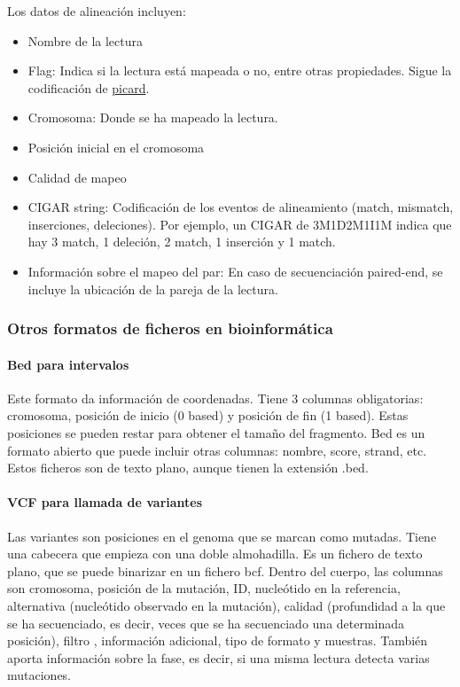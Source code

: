 Los datos de alineación incluyen: 
\begin{itemize} 
\item Nombre de la lectura 
\item Flag: Indica si la lectura está mapeada o no, entre otras propiedades. Sigue la codificación de \href{https://broadinstitute.github.io/picard/explain-flags.html}{picard}.
\item Cromosoma: Donde se ha mapeado la lectura. 
\item Posición inicial en el cromosoma 
\item Calidad de mapeo 
\item CIGAR string: Codificación de los eventos de alineamiento (match, mismatch, inserciones, deleciones). Por ejemplo, un CIGAR de 3M1D2M1I1M indica que hay 3 match, 1 deleción, 2 match, 1 inserción y 1 match.
\item Información sobre el mapeo del par: En caso de secuenciación paired-end, se incluye la ubicación de la pareja de la lectura. 
\end{itemize}

\subsubsection{Otros formatos de ficheros en bioinformática}
\paragraph{Bed para intervalos}
Este formato da información de coordenadas. Tiene 3 columnas obligatorias: cromosoma, posición de inicio (0 based) y posición de fin (1 based). Estas posiciones se pueden restar para obtener el tamaño del fragmento. Bed es un formato abierto que puede incluir otras columnas: nombre, score, strand, etc. Estos ficheros son de texto plano, aunque tienen la extensión .bed. 

\paragraph{VCF para llamada de variantes}
Las variantes son posiciones en el genoma que se marcan como mutadas. Tiene una cabecera que empieza con una doble almohadilla. Es un fichero de texto plano, que se puede binarizar en un fichero bcf. Dentro del cuerpo, las columnas son cromosoma, posición de la mutación, ID, nucleótido en la referencia, alternativa (nucleótido observado en la mutación), calidad (profundidad a la que se ha secuenciado, es decir, veces que se ha secuenciado una determinada posición), filtro , información adicional, tipo de formato y muestras. También aporta información sobre la fase, es decir, si una misma lectura detecta varias mutaciones.

